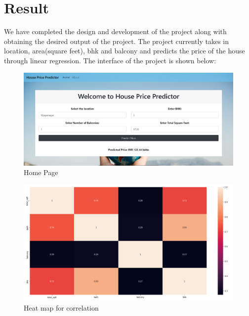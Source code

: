 \section{Result}
\vspace{-18pt}
We have completed the design and development of the project along with obtaining the desired output of the project. The project currently takes in location, area(square feet), bhk and balcony and predicts the price of the house through linear regression. The interface of the project is shown below: \par
\begin{figure}[tbh] %
\begin{center}
	\includegraphics[width=5in]{hh1.jpg} 
	\caption{Home Page} %
	\label{Home Page} %
\end{center}
\end{figure}
\begin{figure}[tbh] %
\begin{center}
	\includegraphics[width=5in]{heatmap.png} 
	\caption{Heat map for correlation } %
	\label{Heat map for correlation} %
\end{center}
\end{figure}
